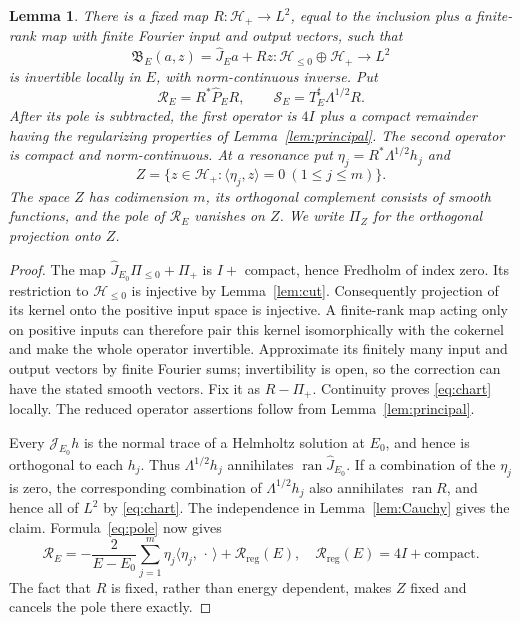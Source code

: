 \documentclass[11pt]{amsart}
\numberwithin{equation}{section}
\newtheorem{lemma}{Lemma}[section]
\newcommand{\JJ}{\mathcal J}
\newcommand{\ran}{\operatorname{ran}}
\newcommand{\ip}[2]{\langle #1,#2\rangle}
\begin{document}
\begin{lemma}\label{lem:chart}
There is a fixed map $R:\mathcal H_+\to L^2$, equal to the inclusion plus
a finite-rank map with finite Fourier input and output vectors, such that
\begin{equation}\label{eq:chart}
 \mathfrak B_E(a,z)=\widehat J_Ea+Rz:
 \mathcal H_{\le0}\oplus\mathcal H_+\longrightarrow L^2
\end{equation}
is invertible locally in $E$, with norm-continuous inverse. Put
\[
 \mathscr R_E=R^*\widehat P_ER,
 \qquad \mathscr S_E=T_E^\sharp\Lambda^{1/2}R.
\]
After its pole is subtracted, the first operator is $4I$ plus a
compact remainder having the regularizing properties of
Lemma~\ref{lem:principal}. The second operator is compact and
norm-continuous. At a resonance put
$\eta_j=R^*\Lambda^{1/2}h_j$ and
\[
 Z=\{z\in\mathcal H_+:\ip{\eta_j}z=0\ (1\le j\le m)\}.
\]
The space $Z$ has codimension $m$, its orthogonal complement consists
of smooth functions, and the pole of $\mathscr R_E$ vanishes on $Z$.
We write $\Pi_Z$ for the orthogonal projection onto $Z$.
\end{lemma}
\begin{proof}
The map $\widehat J_{E_0}\Pi_{\le0}+\Pi_+$ is $I+$ compact, hence Fredholm
of index zero. Its restriction to $\mathcal H_{\le0}$ is injective by
Lemma~\ref{lem:cut}. Consequently projection of its kernel onto the
positive input space is injective. A finite-rank map acting only on
positive inputs can therefore pair this kernel isomorphically with the
cokernel and make the whole operator invertible. Approximate its finitely
many input and output vectors by finite Fourier sums; invertibility is
open, so the correction can have the stated smooth vectors. Fix it as
$R-\Pi_+$. Continuity proves \eqref{eq:chart} locally.
The reduced operator assertions follow from Lemma~\ref{lem:principal}.

Every $\JJ_{E_0}h$ is the normal trace of a Helmholtz solution at $E_0$,
and hence is orthogonal to each $h_j$. Thus
$\Lambda^{1/2}h_j$ annihilates $\ran\widehat J_{E_0}$. If a combination
of the $\eta_j$ is zero, the corresponding combination of
$\Lambda^{1/2}h_j$ also annihilates $\ran R$, and hence all of $L^2$ by
\eqref{eq:chart}. The independence in Lemma~\ref{lem:Cauchy} gives the
claim. Formula~\eqref{eq:pole} now gives
\begin{equation}\label{eq:reduced-pole}
 \mathscr R_E=-\frac2{E-E_0}\sum_{j=1}^m
                      \eta_j\ip{\eta_j}{\,\cdot\,}
                         +\mathscr R_{\mathrm{reg}}(E),
 \quad \mathscr R_{\mathrm{reg}}(E)=4I+\text{compact}.
\end{equation}
The fact that $R$ is fixed, rather than energy dependent, makes $Z$ fixed
and cancels the pole there exactly.
\end{proof}
\end{document}
